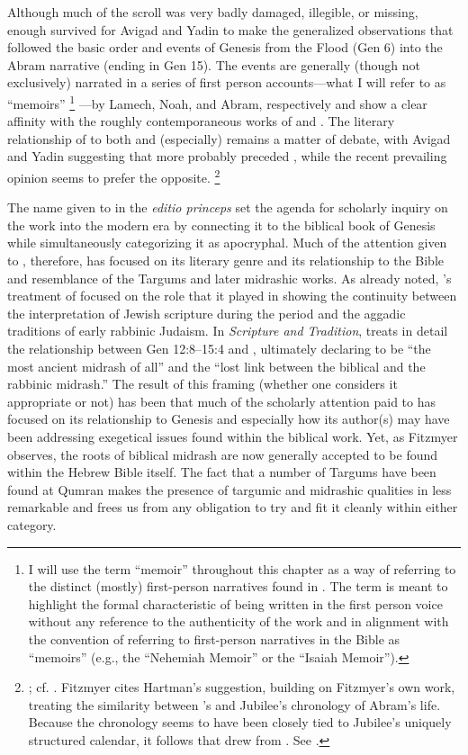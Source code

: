 Although much of the scroll was very badly damaged, illegible, or missing, enough survived for Avigad and Yadin to make the generalized observations that \ga followed the basic order and events of Genesis from the Flood (Gen 6) into the Abram narrative (ending in Gen 15). The events are generally (though not exclusively) narrated in a series of first person accounts---what I will refer to as ``memoirs''%
    \footnote{I will use the term ``memoir'' throughout this chapter as a way of referring to the distinct (mostly) first-person narratives found in \ga. The term is meant to highlight the formal characteristic of being written in the first person voice without any reference to the authenticity of the work and in alignment with the convention of referring to first-person narratives in the Bible as ``memoirs'' (e.g., the ``Nehemiah Memoir'' or the ``Isaiah Memoir'').}%
---by Lamech, Noah, and Abram, respectively and show a clear affinity with the roughly contemporaneous works of \firstenoch and \jub.%
    \autocite[16--37]{avigad-yadin1956}
The literary relationship of \ga to both \firstenoch and (especially) \jub remains a matter of debate, with Avigad and Yadin suggesting that \ga more probably preceded \jub, while the recent prevailing opinion seems to prefer the opposite.%
    \footnote{\Cite[38]{avigad-yadin1956}; cf. \cite[20--21]{fitzmyer2004}. Fitzmyer cites Hartman's suggestion, building on Fitzmyer's own work, treating the similarity between \ga's and Jubilee's chronology of Abram's life. Because the chronology seems to have been closely tied to Jubilee's uniquely structured calendar, it follows that \ga drew from \jub. See \cite[497]{hartman_cbq1966}.}

The name given to \ga in the \emph{editio princeps} set the agenda for scholarly inquiry on the work into the modern era by connecting it to the biblical book of Genesis while simultaneously categorizing it as apocryphal. Much of the attention given to \ga, therefore, has focused on its literary genre and its relationship to the Bible and resemblance of the Targums and later midrashic works. As already noted, \vermes's treatment of \ga focused on the role that it played in showing the continuity between the interpretation of Jewish scripture during the \secondtemple period and the aggadic traditions of early rabbinic Judaism. In \emph{Scripture and Tradition}, \vermes treats in detail the relationship between Gen 12:8--15:4 and \ga {}, ultimately declaring \ga to be ``the most ancient midrash of all'' and the ``lost link between the biblical and the rabbinic midrash.''%
    \autocite[124]{vermes1961}
The result of this framing (whether one considers it appropriate or not) has been that much of the scholarly attention paid to \ga has focused on its relationship to Genesis and especially how its author(s) may have been addressing exegetical issues found within the biblical work. Yet, as Fitzmyer observes, the roots of biblical midrash are now generally accepted to be found within the Hebrew Bible itself.%
    \autocite[20]{fitzmyer2004}
The fact that a number of Targums have been found at Qumran makes the presence of targumic and midrashic qualities in \ga less remarkable and frees us from any obligation to try and fit it cleanly within either category.

